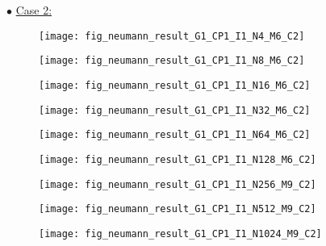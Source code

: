 \documentclass{article}
\begin{document}
	\noindent$\bullet$ \underline{Case 2:}
	\begin{figure}[H]
		\centering	\texttt{[image: fig\_neumann\_result\_G1\_CP1\_I1\_N4\_M6\_C2]}
	\end{figure}
	\begin{figure}[H]
		\centering	\texttt{[image: fig\_neumann\_result\_G1\_CP1\_I1\_N8\_M6\_C2]}
	\end{figure}
	\begin{figure}[H]
		\centering	\texttt{[image: fig\_neumann\_result\_G1\_CP1\_I1\_N16\_M6\_C2]}
	\end{figure}
	\begin{figure}[H]
		\centering	\texttt{[image: fig\_neumann\_result\_G1\_CP1\_I1\_N32\_M6\_C2]}
	\end{figure}
	\begin{figure}[H]
		\centering	\texttt{[image: fig\_neumann\_result\_G1\_CP1\_I1\_N64\_M6\_C2]}
	\end{figure}
	\begin{figure}[H]
		\centering	\texttt{[image: fig\_neumann\_result\_G1\_CP1\_I1\_N128\_M6\_C2]}
	\end{figure}
	\begin{figure}[H]
		\centering	\texttt{[image: fig\_neumann\_result\_G1\_CP1\_I1\_N256\_M9\_C2]}
	\end{figure}
	\begin{figure}[H]
		\centering	\texttt{[image: fig\_neumann\_result\_G1\_CP1\_I1\_N512\_M9\_C2]}
	\end{figure}
	\begin{figure}[H]
		\centering	\texttt{[image: fig\_neumann\_result\_G1\_CP1\_I1\_N1024\_M9\_C2]}
	\end{figure}
\end{document}
